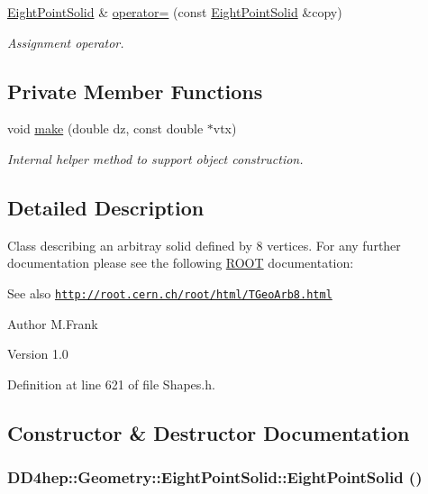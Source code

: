 \begin{DoxyCompactItemize}
\hyperlink{class_d_d4hep_1_1_geometry_1_1_eight_point_solid}{EightPointSolid} \& \hyperlink{class_d_d4hep_1_1_geometry_1_1_eight_point_solid_aa9fdc9420f5096e3075540a12b79cd2a}{operator=} (const \hyperlink{class_d_d4hep_1_1_geometry_1_1_eight_point_solid}{EightPointSolid} \&copy)
\begin{DoxyCompactList}\small\item\em Assignment operator. \item\end{DoxyCompactList}\end{DoxyCompactItemize}
\subsection*{Private Member Functions}
\begin{DoxyCompactItemize}
\item 
void \hyperlink{class_d_d4hep_1_1_geometry_1_1_eight_point_solid_a037a713544e344700d7f3bd2e29406bb}{make} (double dz, const double $\ast$vtx)
\begin{DoxyCompactList}\small\item\em Internal helper method to support object construction. \item\end{DoxyCompactList}\end{DoxyCompactItemize}


\subsection{Detailed Description}
Class describing an arbitray solid defined by 8 vertices. For any further documentation please see the following \hyperlink{namespace_r_o_o_t}{ROOT} documentation: \begin{DoxySeeAlso}{See also}
\href{http://root.cern.ch/root/html/TGeoArb8.html}{\tt http://root.cern.ch/root/html/TGeoArb8.html}
\end{DoxySeeAlso}
\begin{DoxyAuthor}{Author}
M.Frank 
\end{DoxyAuthor}
\begin{DoxyVersion}{Version}
1.0 
\end{DoxyVersion}


Definition at line 621 of file Shapes.h.

\subsection{Constructor \& Destructor Documentation}
\hypertarget{class_d_d4hep_1_1_geometry_1_1_eight_point_solid_aeedf6b76a2ae0337100dd3fdc3a56237}{
\subsubsection[{EightPointSolid}]{\setlength{\rightskip}{0pt plus 5cm}DD4hep::Geometry::EightPointSolid::EightPointSolid ()}}
\label{class_d_d4hep_1_1_geometry_1_1_eight_point_solid_aeedf6b76a2ae0337100dd3fdc3a56237}


